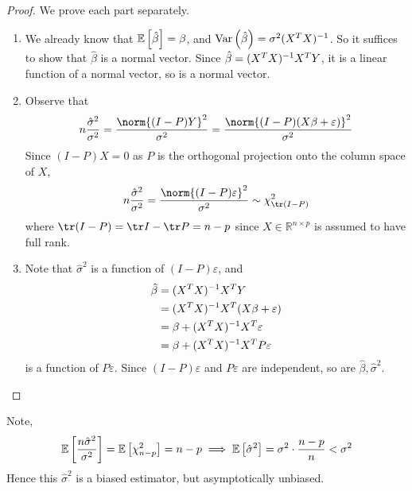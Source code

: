 \begin{proof}
	We prove each part separately.
	\begin{enumerate}
		\item We already know that $\mathbb{E}\left[{\hat \beta}\right] = \beta$, and $\operatorname{Var}\left({\hat \beta}\right) = \sigma^2 (X^T X)^{-1}$.
		      So it suffices to show that $\hat \beta$ is a normal vector.
		      Since $\hat \beta = (X^T X)^{-1} X^T Y$, it is a linear function of a normal vector, so is a normal vector.
		\item Observe that
		      \begin{align*}
			      n\frac{\hat\sigma^2}{\sigma^2} = \frac{\norm{(I-P)Y}^2}{\sigma^2} = \frac{\norm{(I-P)(X\beta+\varepsilon)}^2}{\sigma^2}
		      \end{align*}
		      Since $(I-P)X = 0$ as $P$ is the orthogonal projection onto the column space of $X$,
		      \begin{align*}
			      n\frac{\hat\sigma^2}{\sigma^2} = \frac{\norm{(I-P)\varepsilon}^2}{\sigma^2} \sim \chi^2_{\tr (I-P)}
		      \end{align*}
		      where $\tr (I-P) = \tr I - \tr P = n - p$ since $X \in \mathbb R^{n \times p}$ is assumed to have full rank.
		\item Note that $\hat \sigma^2$ is a function of $(I-P)\varepsilon$, and
		      \begin{align*}
			      \hat\beta & = (X^T X)^{-1} X^T Y                    \\
			                & = (X^T X)^{-1} X^T (X\beta+\varepsilon) \\
			                & = \beta + (X^T X)^{-1} X^T \varepsilon  \\
			                & = \beta + (X^T X)^{-1} X^T P\varepsilon
		      \end{align*}
		      is a function of $P\varepsilon$.
		      Since $(I-P)\varepsilon$ and $P \varepsilon$ are independent, so are $\hat \beta, \hat \sigma^2$.
	\end{enumerate}
\end{proof}
Note,
\begin{align*}
	\mathbb{E}\left[{\frac{n\hat\sigma^2}{\sigma^2}}\right] = \mathbb{E}\left[{\chi^2_{n-p}}\right] = n-p \implies \mathbb{E}\left[{\hat\sigma^2}\right] = \sigma^2 \cdot \frac{n-p}{n} < \sigma^2
\end{align*}
Hence this $\hat \sigma^2$ is a biased estimator, but asymptotically unbiased.

